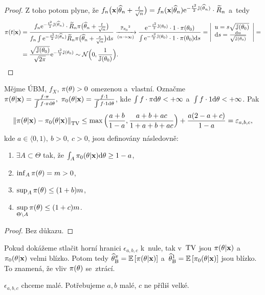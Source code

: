 \begin{dusl}
\begin{proof}
		Z toho potom plyne, že $f_n\big(\textbf{x}|\widehat{\theta}_n+\frac{t}{\sqrt{n}}\big)=f_n(\textbf{x}|\widehat{\theta}_n)\mathrm{e}^{-\frac{t^2}{2}\mathbb{J}(\widehat{\theta}_n)}\cdot\widetilde{R}_n$ a~tedy \[
		\begin{split}
		\pi(t|\textbf{x})&=\frac{f_n\e{-\frac{t^2}{2}\mathbb{J}(\htn)}\cdot\widetilde{R}_n \pi\big( \htn+\frac{t}{\sqrt{n}} \big)}{f_n\int \e{-\frac{s^2}{2}\mathbb{J}(\htn)}\widetilde{R}_n \pi\big(\htn+\frac{s}{\sqrt{n}}\big)\d s}\xrightarrow[(n\rightarrow \infty)]{\PP_{\t_0}\text{\footnotemark}}\frac{\e{-\frac{t^2}{2}\mathbb{J}(\t_0)}\cdot1\cdot \pi(\t_0)}{\int\e{-\frac{s^2}{2}\mathbb{J}(\t_0)}\cdot1\cdot\pi(\t_0)\d s}=\left| \begin{array}{l}
		u=s\sqrt{\mathbb{J}(\t_0)}\\\d s=\frac{\d u}{\sqrt{\mathbb{J}(\t_0)}}		
		\end{array}
		\right|=\\&=\frac{\sqrt{\mathbb{J}(\t_0)}}{\sqrt{2\pi}}\e{-\frac{t^2}{2}\mathbb{J}(\t_0)}\sim\NN\Big( 0,\frac{1}{\mathbb{J}(\t_0)} \Big).
		\end{split}
		\]
	\end{proof}
\end{dusl}
\begin{theorem}
	Mějme ÚBM, $f_X$, $\pi(\theta)>0$ omezenou a~vlastní. Označme $\pi(\theta|\textbf{x})=\frac{f\cdot\pi}{\int f\cdot\pi\mathrm{d}\theta},~\pi_0(\theta|\textbf{x})=\frac{f\cdot1}{\int f\cdot1 \mathrm{d}\theta}$, kde $\int f\cdot\pi\mathrm{d}\theta<+\infty$ a~$\int f\cdot1 \mathrm{d}\theta<+\infty$. Pak
	$$ \left\|\pi(\theta|\textbf{x})-\pi_0(\theta|\textbf{x})\right\|_{\mathrm{TV}}\leq \max\Big(\frac{a+b}{1-a},\frac{a+b+ac}{1+a+b+ac}\Big)+\frac{a(2-a+c)}{1-a}=\varepsilon_{a,b,c},$$
	kde $a\in\langle 0,1),~b>0,~c>0$, jsou definovány následovně:\begin{enumerate}[1)]
		\item $\exists A\subset \Theta$ tak, že $\int_A \pi_0(\theta|\textbf{x})\mathrm{d}\theta\geq 1-a$,
		\item $\inf_A \pi(\theta)=m>0$,
		\item $\sup_A \pi(\theta)\leq (1+b)m$,
		\item $\sup\limits_{\Theta\setminus A} \pi(\theta)\leq(1+c)m$. 
	\end{enumerate}
\end{theorem}
\begin{proof}
Bez důkazu.
\end{proof}
\begin{dusl}
	Pokud dokážeme stlačit horní hranici $\epsilon_{a,b,c}$ k~nule, tak v~$\mathrm{TV}$ jsou $\pi(\theta|\textbf{x})$ a~$\pi_0(\theta|\textbf{x})$ velmi blízko. Potom tedy $\widehat{\theta}_\mathrm{B}^\pi=\mathbb{E}\left[ \pi(\theta|\textbf{x}) \right]$ a~$\widehat{\theta}_\mathrm{B}^1=\mathbb{E}\left[ \pi_0(\theta|\textbf{x}) \right]$ jsou blízko. To znamená, že vliv $\pi(\theta)$ se~ztrácí.
\end{dusl}
\begin{remark}
	$\epsilon_{a,b,c}$ chceme malé. Potřebujeme $a,b$ malé, $c$ ne příliš velké.
\end{remark}


